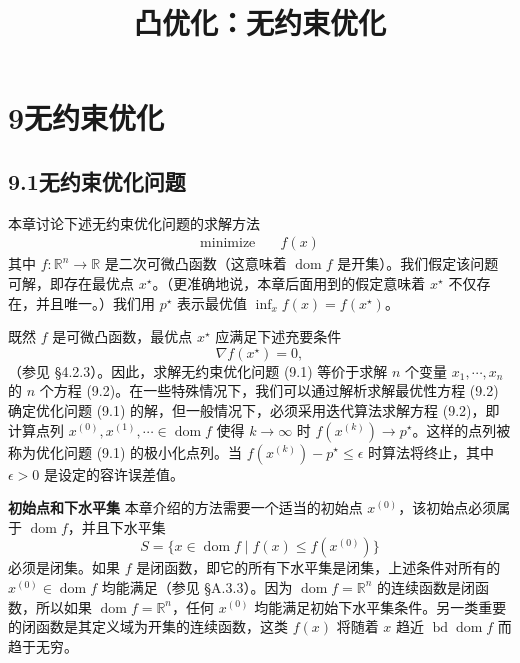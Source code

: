 \documentclass[UTF8,12pt,a4paper,fontset=fandol]{ctexart}
\title{凸优化：无约束优化}
\author{}
\date{}
\begin{document}
\maketitle

\section*{9\quad 无约束优化}

\subsection*{9.1\quad 无约束优化问题}

本章讨论下述无约束优化问题的求解方法
\begin{equation}
\begin{aligned}
\text{minimize}\quad & f(x)
\end{aligned}
\tag{9.1}
\end{equation}
其中 $f:\mathbb{R}^n\to\mathbb{R}$ 是二次可微凸函数（这意味着 $\operatorname{dom} f$ 是开集）。我们假定该问题可解，即存在最优点 $x^\star$。（更准确地说，本章后面用到的假定意味着 $x^\star$ 不仅存在，并且唯一。）我们用 $p^\star$ 表示最优值 $\inf_x f(x)=f(x^\star)$。

既然 $f$ 是可微凸函数，最优点 $x^\star$ 应满足下述充要条件
\begin{equation}
\nabla f(x^\star)=0,
\tag{9.2}
\end{equation}
（参见 \S4.2.3）。因此，求解无约束优化问题 (9.1) 等价于求解 $n$ 个变量 $x_1,\cdots,x_n$ 的 $n$ 个方程 (9.2)。在一些特殊情况下，我们可以通过解析求解最优性方程 (9.2) 确定优化问题 (9.1) 的解，但一般情况下，必须采用迭代算法求解方程 (9.2)，即计算点列 $x^{(0)},x^{(1)},\cdots\in\operatorname{dom} f$ 使得 $k\to\infty$ 时 $f(x^{(k)})\to p^\star$。这样的点列被称为优化问题 (9.1) 的极小化点列。当 $f(x^{(k)})-p^\star\leq \epsilon$ 时算法将终止，其中 $\epsilon>0$ 是设定的容许误差值。

\noindent\textbf{初始点和下水平集}\quad
本章介绍的方法需要一个适当的初始点 $x^{(0)}$，该初始点必须属于 $\operatorname{dom} f$，并且下水平集
\begin{equation}
S=\{x\in\operatorname{dom} f\mid f(x)\leq f(x^{(0)})\}
\tag{9.3}
\end{equation}
必须是闭集。如果 $f$ 是闭函数，即它的所有下水平集是闭集，上述条件对所有的 $x^{(0)}\in\operatorname{dom} f$ 均能满足（参见 \S A.3.3）。因为 $\operatorname{dom} f=\mathbb{R}^n$ 的连续函数是闭函数，所以如果 $\operatorname{dom} f=\mathbb{R}^n$，任何 $x^{(0)}$ 均能满足初始下水平集条件。另一类重要的闭函数是其定义域为开集的连续函数，这类 $f(x)$ 将随着 $x$ 趋近 $\operatorname{bd}\operatorname{dom} f$ 而趋于无穷。
\end{document}
